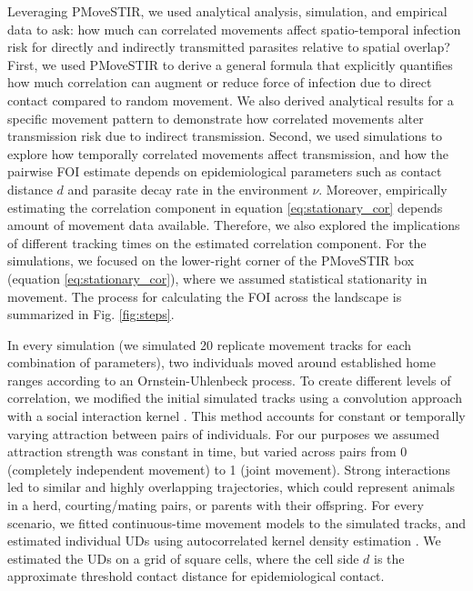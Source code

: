 \documentclass[letterpaper]{article}
\begin{document}
Leveraging PMoveSTIR, we used analytical analysis, simulation, and empirical data to ask: how much can correlated movements affect spatio-temporal infection risk for directly and indirectly transmitted parasites relative to spatial overlap? 
First, we used PMoveSTIR to derive a general formula that explicitly quantifies how much correlation can augment or reduce force of infection due to direct contact compared to random movement. We also derived analytical results for a specific movement pattern to demonstrate how correlated movements alter transmission risk due to indirect transmission.
Second, we used simulations to explore how temporally correlated movements affect  transmission, and how the pairwise FOI estimate depends on epidemiological parameters such as contact distance $d$ and parasite decay rate in the environment $\nu$. Moreover, empirically estimating the correlation component in equation \ref{eq:stationary_cor} depends amount of movement data available. Therefore, we also explored the implications of different tracking times on the estimated correlation component. For the simulations, we focused on the lower-right corner of the PMoveSTIR box (equation \ref{eq:stationary_cor}), where we assumed statistical stationarity in movement. The process for calculating the FOI across the landscape is summarized in Fig. \ref{fig:steps}.

In every simulation (we simulated 20 replicate movement tracks for each combination of parameters), two individuals moved around established home ranges according to an Ornstein-Uhlenbeck process. To create different levels of correlation, we modified the initial simulated tracks using a convolution approach with a social interaction kernel \citep{Scharf2018}. This method accounts for constant or temporally varying attraction between pairs of individuals. For our purposes we assumed attraction strength was constant in time, but varied across pairs from 0 (completely independent movement) to 1 (joint movement). Strong interactions led to similar and highly overlapping trajectories, which could represent animals in a herd, courting/mating pairs, or parents with their offspring.
For every scenario, we fitted continuous-time movement models to the simulated tracks, and estimated individual UDs using autocorrelated kernel density estimation \citep{Calabrese2016}. We estimated the UDs on a grid of square cells, where the cell side $d$ is the approximate threshold contact distance for epidemiological contact. 
\end{document}
